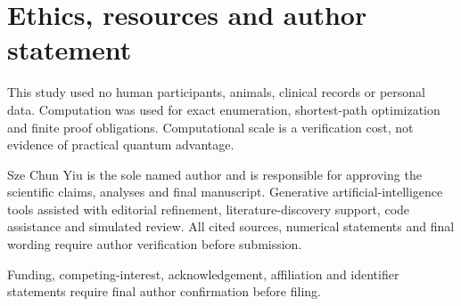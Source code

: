 \section*{Ethics, resources and author statement}

This study used no human participants, animals, clinical records or personal data.  Computation was used for exact enumeration, shortest-path optimization and finite proof obligations.  Computational scale is a verification cost, not evidence of practical quantum advantage.

Sze Chun Yiu is the sole named author and is responsible for approving the scientific claims, analyses and final manuscript.  Generative artificial-intelligence tools assisted with editorial refinement, literature-discovery support, code assistance and simulated review.  All cited sources, numerical statements and final wording require author verification before submission.

Funding, competing-interest, acknowledgement, affiliation and identifier statements require final author confirmation before filing.
